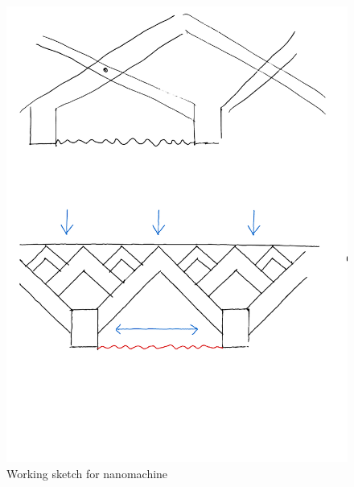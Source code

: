 \begin{figure}[H]
  \centering
  \includegraphics[width=0.5\linewidth]{figures/negative_coefficient/nanomachine.pdf}
  \caption{Working sketch for nanomachine}
  \label{fig:nanomachine}
\end{figure}



